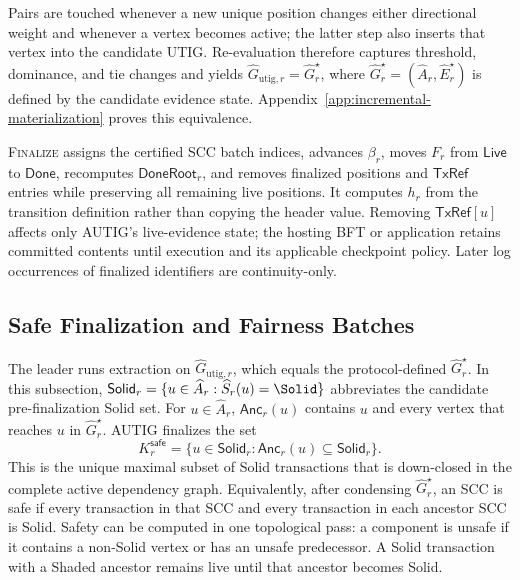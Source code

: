 Pairs are touched whenever a new unique position changes either directional
weight and whenever a vertex becomes active; the latter step also inserts that
vertex into the candidate UTIG.  Re-evaluation therefore captures threshold,
dominance, and tie changes and yields
$\widehat G_{\mathrm{utig},r}=\widehat G_r^\star$, where
$\widehat G_r^\star=(\widehat A_r,\widehat E_r^\star)$ is defined by the
candidate evidence state.  Appendix~\ref{app:incremental-materialization}
proves this equivalence.

\textsc{Finalize} assigns the certified SCC batch indices, advances $\beta_r$,
moves $F_r$ from $\mathsf{Live}$ to $\mathsf{Done}$, recomputes
$\mathsf{DoneRoot}_r$, and removes finalized positions and $\mathsf{TxRef}$
entries while preserving all remaining live positions.  It computes $h_r$
from the transition definition rather than copying the header value.  Removing
$\mathsf{TxRef}[u]$ affects only AUTIG's live-evidence state; the hosting BFT or
application retains committed contents until execution and its applicable
checkpoint policy.  Later log occurrences of finalized identifiers are
continuity-only.

\subsection{Safe Finalization and Fairness Batches}
\label{sec:safe-extraction}

The leader runs extraction on $\widehat G_{\mathrm{utig},r}$, which equals the
protocol-defined $\widehat G_r^\star$.  In this subsection,
$\mathsf{Solid}_r=\{u\in\widehat A_r:\widehat S_r(u)=\Solid\}$ abbreviates the
candidate pre-finalization Solid set.
For $u\in\widehat A_r$, $\mathsf{Anc}_r(u)$ contains $u$ and every vertex
that reaches $u$ in $\widehat G_r^\star$.  AUTIG finalizes the set
\begin{equation}
 K_r^{\mathsf{safe}}
   =\{u\in\mathsf{Solid}_r:
          \mathsf{Anc}_r(u)\subseteq\mathsf{Solid}_r\}.
 \label{eq:safe-closure}
\end{equation}
This is the unique maximal subset of Solid transactions that is down-closed
in the complete active dependency graph.  Equivalently, after condensing
$\widehat G_r^\star$, an SCC is safe if every transaction in that SCC and every
transaction in each ancestor SCC is Solid.  Safety can be computed in one
topological pass: a component is unsafe if it contains a non-Solid vertex or
has an unsafe predecessor.  A Solid transaction with a Shaded ancestor
remains live until that ancestor becomes Solid.

